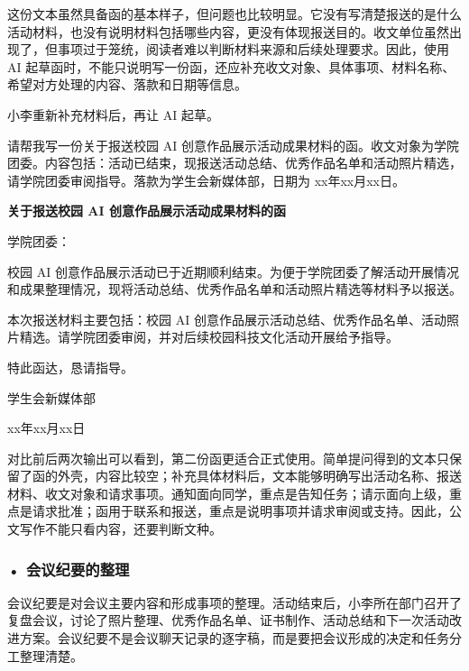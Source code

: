 这份文本虽然具备函的基本样子，但问题也比较明显。它没有写清楚报送的是什么活动材料，也没有说明材料包括哪些内容，更没有体现报送目的。收文单位虽然出现了，但事项过于笼统，阅读者难以判断材料来源和后续处理要求。因此，使用 AI 起草函时，不能只说明写一份函，还应补充收文对象、具体事项、材料名称、希望对方处理的内容、落款和日期等信息。

小李重新补充材料后，再让 AI 起草。

\begin{userbox}
请帮我写一份关于报送校园 AI 创意作品展示活动成果材料的函。收文对象为学院团委。内容包括：活动已结束，现报送活动总结、优秀作品名单和活动照片精选，请学院团委审阅指导。落款为学生会新媒体部，日期为 xx年xx月xx日。
\end{userbox}

\begin{aibox}
\begin{center}
\textbf{关于报送校园 AI 创意作品展示活动成果材料的函}
\end{center}

\noindent 学院团委：

\par\qquad 校园 AI 创意作品展示活动已于近期顺利结束。为便于学院团委了解活动开展情况和成果整理情况，现将活动总结、优秀作品名单和活动照片精选等材料予以报送。

\par\qquad 本次报送材料主要包括：校园 AI 创意作品展示活动总结、优秀作品名单、活动照片精选。请学院团委审阅，并对后续校园科技文化活动开展给予指导。

\par\qquad 特此函达，恳请指导。

\par\hfill 学生会新媒体部

\par\hfill xx年xx月xx日
\end{aibox}

对比前后两次输出可以看到，第二份函更适合正式使用。简单提问得到的文本只保留了函的外壳，内容比较空；补充具体材料后，文本能够明确写出活动名称、报送材料、收文对象和请求事项。通知面向同学，重点是告知任务；请示面向上级，重点是请求批准；函用于联系和报送，重点是说明事项并请求审阅或支持。因此，公文写作不能只看内容，还要判断文种。

\subsubsection*{\textbf{• 会议纪要的整理}}

会议纪要是对会议主要内容和形成事项的整理。活动结束后，小李所在部门召开了复盘会议，讨论了照片整理、优秀作品名单、证书制作、活动总结和下一次活动改进方案。会议纪要不是会议聊天记录的逐字稿，而是要把会议形成的决定和任务分工整理清楚。

